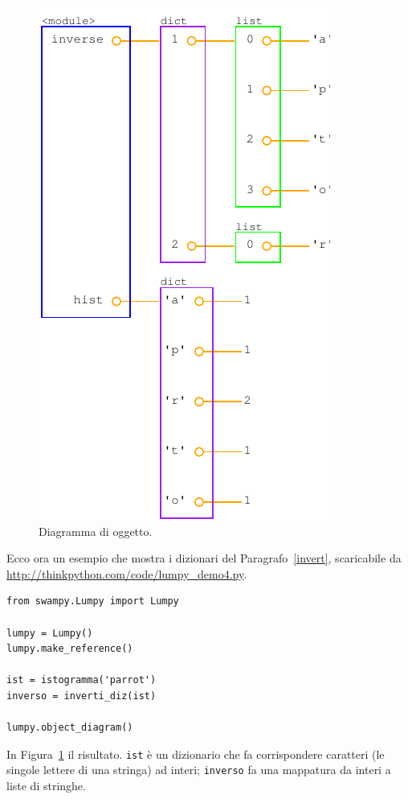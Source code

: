 \documentclass[10pt]{book}
\begin{document}
\begin{figure}
\centerline
{\includegraphics[scale=0.7]{figs/lumpydemo4.pdf}}
\caption{Diagramma di oggetto.}
\label{fig.lumpy4}
\end{figure}

Ecco ora un esempio che mostra i dizionari del Paragrafo~\ref{invert}, scaricabile da \url{http://thinkpython.com/code/lumpy_demo4.py}.

\begin{verbatim}
from swampy.Lumpy import Lumpy

lumpy = Lumpy()
lumpy.make_reference()

ist = istogramma('parrot')
inverso = inverti_diz(ist)

lumpy.object_diagram()
\end{verbatim}

In Figura~\ref{fig.lumpy4} il risultato.  {\tt ist} è un dizionario che fa corrispondere caratteri (le singole lettere di una stringa) ad interi; 
{\tt inverso} fa una mappatura da interi a liste di stringhe.
\end{document}
